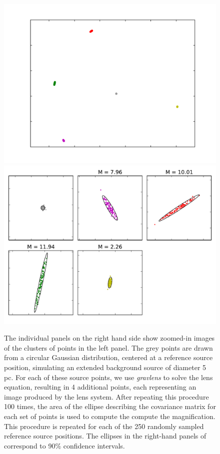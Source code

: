 \begin{figure}
	\label{fig:mag_illustration}
	\includegraphics[trim=0cm 0cm 0cm 0cm,clip,width=.48\textwidth]{./figures_sls/mag_illustration1-eps-converted-to.pdf}
	\includegraphics[trim=0cm 0cm 0cm 0cm,clip,width=.48\textwidth]{./figures_sls/mag_illustration2-eps-converted-to.pdf}
	\caption[Illustration of finite-source magnification]{The individual panels on the right hand side show zoomed-in images of the clusters of points in the left panel. The grey points are drawn from a circular Gaussian distribution, centered at a reference source position, simulating an extended background source of diameter 5 pc. For each of these source points, we use \textit{gravlens} to solve the lens equation, resulting in 4 additional points, each representing an image produced by the lens system. After repeating this procedure 100 times, the area of the ellipse describing the covariance matrix for each set of points is used to compute the compute the magnification. This procedure is repeated for each of the 250 randomly sampled reference source positions. The ellipses in the right-hand panels of correspond to 90\% confidence intervals.}
\end{figure}


